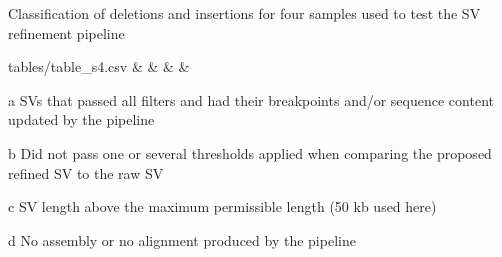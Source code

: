 \documentclass[12pt]{article}
\begin{document}
\begin{table}
	\centering
	\caption{Classification of deletions and insertions for four samples used to test the SV refinement pipeline}
	\label{table_s4}

	\begin{threeparttable}\small

		\csvreader[head to column names,
		tabular = l*4{c},
		table head = {\toprule Sample & Refined\tnote{a} & Below thresholds\tnote{b} & Above max. SVLEN\tnote{c} & No alignment\tnote{d} \\\midrule},%
			table foot = {\bottomrule}]%
		{tables/table_s4.csv}%
		{}%
		{\sample &  & \belowthr & \svlen & \noalignment}

		\begin{tablenotes}\footnotesize
		\item[a] SVs that passed all filters and had their breakpoints and/or sequence content updated by the pipeline
		\item[b] Did not pass one or several thresholds applied when comparing the proposed refined SV to the raw SV
		\item[c] SV length above the maximum permissible length (50 kb used here)
		\item[d] No assembly or no alignment produced by the pipeline
		\end{tablenotes}
	\end{threeparttable}

\end{table}

\clearpage%

\end{document}

